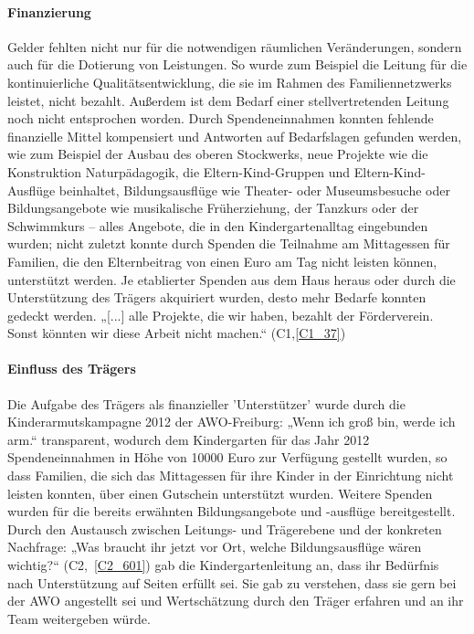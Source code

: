\paragraph{Finanzierung}
Gelder fehlten nicht nur für die notwendigen räumlichen Veränderungen, sondern auch für die Dotierung von Leistungen. So wurde zum Beispiel die Leitung für die kontinuierliche Qualitätsentwicklung, die sie im Rahmen des Familiennetzwerks leistet, nicht bezahlt. Außerdem ist dem Bedarf einer stellvertretenden Leitung noch nicht entsprochen worden. 
Durch Spendeneinnahmen konnten fehlende finanzielle Mittel kompensiert und Antworten auf Bedarfslagen gefunden werden, wie zum Beispiel der Ausbau des oberen Stockwerks, neue Projekte wie die Konstruktion Naturpädagogik, die Eltern-Kind-Gruppen und Eltern-Kind-Ausflüge beinhaltet, Bildungsausflüge wie Theater- oder Museumsbesuche oder Bildungsangebote wie musikalische Früherziehung, der Tanzkurs oder der Schwimmkurs – alles Angebote, die in den Kindergartenalltag eingebunden wurden; nicht zuletzt konnte durch Spenden die Teilnahme am Mittagessen für Familien, die den Elternbeitrag von einen Euro am Tag nicht leisten können, unterstützt werden.
Je etablierter Spenden aus dem Haus heraus oder durch die Unterstützung des Trägers akquiriert wurden, desto mehr Bedarfe konnten gedeckt werden. „[...] alle Projekte, die wir haben, bezahlt der Förderverein. Sonst könnten wir diese Arbeit nicht machen.“ (C1,\ref{C1_37})

\paragraph{Einfluss des Trägers}
Die Aufgabe des Trägers als finanzieller 'Unterstützer' wurde durch die Kinderarmutskampagne 2012 der AWO-Freiburg: „Wenn ich groß bin, werde ich arm.“ transparent, wodurch dem Kindergarten für das Jahr 2012 Spendeneinnahmen in Höhe von 10000 Euro zur Verfügung gestellt wurden, so dass Familien, die sich das Mittagessen für ihre Kinder in der Einrichtung nicht leisten konnten, über einen Gutschein unterstützt wurden. Weitere Spenden wurden für die bereits erwähnten Bildungsangebote und -ausflüge bereitgestellt. Durch den Austausch zwischen Leitungs- und Trägerebene und der konkreten Nachfrage: „Was braucht ihr jetzt vor Ort, welche Bildungsausflüge wären wichtig?“ (C2,~\ref{C2_601}) gab die Kindergartenleitung an, dass ihr Bedürfnis nach Unterstützung auf Seiten erfüllt sei. Sie gab zu verstehen, dass sie gern bei der AWO angestellt sei und Wertschätzung durch den Träger erfahren und an ihr Team weitergeben würde. 

